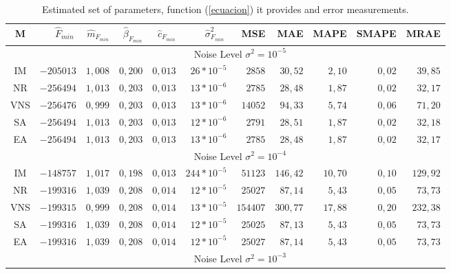 \documentclass{sig-alternate}
\begin{document}
\begin{table*}
\caption{\footnotesize{Estimated set of parameters, function (\ref{ecuacion}) it provides and error measurements.}}
\begin{center}
{\scriptsize
\begin{tabular}{c|rrrrr|rrrrr}
\hline
   M & $\hat{F}_{min}\ $ &  $\hat{m}_{F_{min}}$ &  $\hat{\beta}_{F_{min}}$ &  $\hat{c}_{F_{min}}$ & $\hat{\sigma}^{2}_{F_{min}}\ $&  MSE\hspace{0.2cm} &  MAE &  MAPE &  SMAPE & MRAE  \\

\hline
\hline
&\multicolumn{10}{c}{ Noise Level $ \sigma^2= 10^{-5}$} \\
\hline

	 		IM & $-205013$		&$1,008$	&$0,200$	&$0,013$	&$26*10^{-5}$	& $2858$	&$30,52$ 	&$2,10$	&$0,02$	&$39,85$	\\
	 		NR & $-256494$		&$1,013$	&$0,203$	&$0,013$ 	&$13*10^{-6}$ & $2785$	&$28,48$	&$1,87$	&$0,02$	&$32,17$	\\
            VNS & $-256476$		&$0,999$	&$0,203$	&$0,013$    &$13*10^{-6}$	& $14052$	&$94,33$ 	&$5,74$	&$0,06$	&$71,20$	\\
 			SA & $-256494$    	&$1,013$	&$0,203$	&$0,013$   	&$12*10^{-6}$	&$2791$		&$28,51$  &$1,87$	&$0,02$ &$32,18$	\\
 			EA& $-256494$   	&$1,013$	&$0,203$	&$0,013$	&$13*10^{-6}$ 	&$2785$		&$	28,48$	&$1,87$	&$0,02$	&$32,17$ 	\\
 \hline
\hline
&\multicolumn{10}{c}{Noise Level $ \sigma^2= 10^{-4}$} \\
\hline
	 	    IM & $-148757$		&$1,017$	&$0,198$	&$0,013$	&$244*10^{-5}$	&$51123$ 	&$146,42$ 	&$10,70$ 	&$0,10$	&$129,92$	\\
	 	    NR& $-199316$		&$1,039$	&$0,208$	&$0,014$	&$12*10^{-5}$ &$25027$	&$87,14$	&$5,43$		&$0,05$	&$73,73$ 	\\
            VNS& $-199315$		&$0,999$	&$0,208$	&$0,014$	&$13*10^{-5}$	&$154407$ 	&$300,77$ 	&$17,88$ 	&$0,20$	&$232,38$	\\
 			SA& $-199316$		&$1,039$	&$0,208$	&$0,014$	&$12*10^{-5}$ 	&$25025	$	&$87,13	$	&$5,43$		&$0,05$	&$73,73$	\\
 			EA & $-199316$		&$1,039$	&$0,208$	&$0,014$	&$12*10^{-5}$	&$25027$	&$87,14$	&$5,43$		&$0,05$	&$73,73$	\\
\hline
\hline
&\multicolumn{10}{c}{Noise Level $ \sigma^2= 10^{-3}$} \\

\end{tabular}}
\end{center}
\end{table*}
\end{document}

